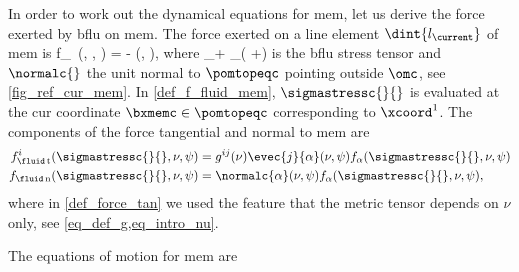 In order to work out the  dynamical equations for \ac{mem}, let us derive the force exerted by \ac{bflu} on \ac{mem}. The force exerted on a line element $\dint{l_\current}$ of \ac{mem}  is \cite{landauFluidMechanics1987}
\be
\label{def_f_fluid_mem}
f_{\fluid\, \alpha}(\sigmastressc{}{}, \nu, \psi) = - \sigmastressc{\alpha}{\beta} \normalc{\beta}(\nu, \psi),
\ee
where
\be
\label{eq_strees_tensor_fluid}
\sigmastressc{\alpha}{\beta} \equiv \sigmafc \delta_{\alpha \beta}+ \eta_\fluid\left( \pderc{ \vfc^\alpha}{\beta} +\pderc{ \vfc^\beta}{\alpha}\right)
\ee
is the \ac{bflu} stress tensor \cite{landauFluidMechanics1987} and $\normalc{}$ the unit normal to $\pomtopeqc$ pointing outside $\omc$, see \cref{fig_ref_cur_mem}.  In \cref{def_f_fluid_mem}, $\sigmastressc{}{}$ is evaluated at the \ac{cur} coordinate $\bxmemc \in \pomtopeqc$ corresponding to $\xcoord^1$.
%
The components of the force  tangential and normal to \ac{mem} are \cite{desernoFluidLipidMembranes2015}
\begin{align}
        \label{def_force_tan}
        f_{\fluid\, \text{t}}^i(\sigmastressc{}{}, \nu, \psi) & = g^{ij}(\nu) \evec{j}{\alpha}(\nu,\psi) f_\alpha(\sigmastressc{}{}, \nu, \psi) \\
        \label{def_force_norm}
        f_{\fluid\, \text{n}} (\sigmastressc{}{}, \nu, \psi)  & = \normalc{\alpha}(\nu, \psi) f_\alpha(\sigmastressc{}{}, \nu, \psi),
\end{align}
where in \cref{def_force_tan} we used the feature that the metric tensor depends on $\nu$ only, see \cref{eq_def_g,eq_intro_nu}.



The equations of motion for \ac{mem}  are \cite{worthmullerIRENEFluIdLayeR2025,al-izziShearDrivenInstabilitiesMembrane2020,arroyoRelaxationDynamicsFluid2009i}

